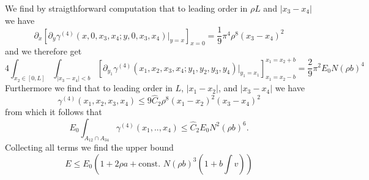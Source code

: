 \documentclass[a4paper,11pt]{article}
\newcommand{\abs}[1]{\left\lvert #1 \right\rvert}
\numberwithin{equation}{section}
\begin{document}
	We find by straigthforward computation that to leading order in $ \rho L $ and $ \abs{x_3-x_4} $ we have \begin{equation}
	\partial_x\left[\partial_{y}\gamma^{(4)}(x,0,x_3,x_4;y,0,x_3,x_4)\bigg\vert_{y=x}\right]_{x=0}=\frac{1}{9}\pi^4\rho^8(x_3-x_4)^2
	\end{equation}
	and we therefore get \begin{equation}
	4\int_{x_2\in[0,L]}\int_{\abs{x_3-x_4}<b}\left[\partial_{y_1}\gamma^{(4)}(x_1,x_2,x_3,x_4;y_1,y_2,y_3,y_4)\bigg\vert_{y_1=x_1}\right]_{x_1=x_2-b}^{x_1=x_2+b}=\frac{2}{9}\pi^2E_0 N (\rho b)^4
	\end{equation}
	Furthermore we find that to leading order in $ L $, $ \abs{x_1-x_2} $, and $ \abs{x_3-x_4} $ we have \begin{equation}
	\gamma^{(4)}(x_1,x_2,x_3,x_4)\leq 9\hat{C}_2\rho^8 (x_1-x_2)^2(x_3-x_4)^2
	\end{equation} from which it follows that \begin{equation}
	E_0\int_{A_{12}\cap A_{34}}\gamma^{(4)}(x_1,..,x_4)\leq \hat{C}_2 E_0 N^2(\rho b)^6.
	\end{equation}
	Collecting all terms we find the upper bound \begin{equation}
	E\leq E_0\left(1+2\rho a+ \text{const. }N(\rho b)^3\left(1+b\int v \right)\right)
	\end{equation}
\end{document}
